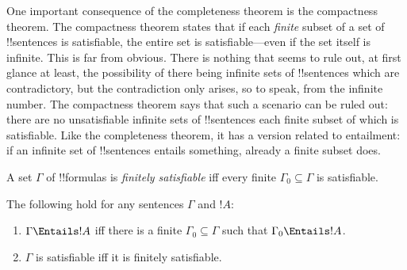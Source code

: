 \documentclass[../../../include/open-logic-section]{subfiles}
\begin{document}
      {}
      {}


One important consequence of the completeness theorem is the
compactness theorem.  The compactness theorem states that if each
\emph{finite} subset of a set of !!{sentence}s is satisfiable, the
entire set is satisfiable---even if the set itself is infinite. This
is far from obvious. There is nothing that seems to rule out, at first
glance at least, the possibility of there being infinite sets of
!!{sentence}s which are contradictory, but the contradiction only
arises, so to speak, from the infinite number.  The compactness
theorem says that such a scenario can be ruled out: there are no
unsatisfiable infinite sets of !!{sentence}s each finite subset of
which is satisfiable. Like the completeness theorem, it has a version
related to entailment: if an infinite set of !!{sentence}s entails
something, already a finite subset does.

\begin{defn}
  A set $\Gamma$ of !!{formula}s is \emph{finitely satisfiable} iff every finite $\Gamma_0 \subseteq \Gamma$ is satisfiable.
\end{defn}

\begin{thm}
The following hold for any sentences $\Gamma$ and $!A$:
\begin{enumerate}
  \item $\Gamma \Entails !A$ iff there is a finite $\Gamma_0
    \subseteq \Gamma$ such that $\Gamma_0 \Entails !A$.
  \item $\Gamma$ is satisfiable iff it is finitely
    satisfiable.
\end{enumerate}
\end{thm}
\end{document}
